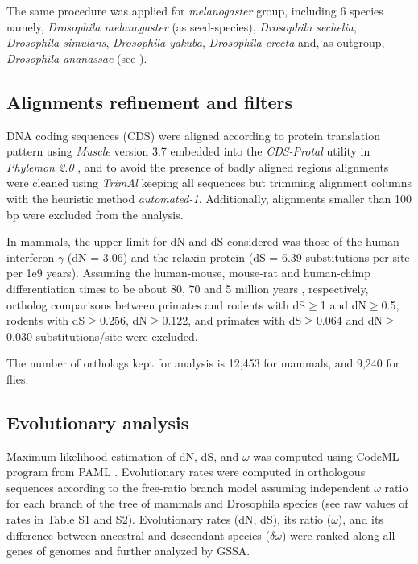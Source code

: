 The same procedure was applied for \textit{melanogaster} group, including 6 species namely, \textit{Drosophila melanogaster} (as \gls{seed}-species), \textit{Drosophila sechelia}, \textit{Drosophila simulans}, \textit{Drosophila yakuba}, \textit{Drosophila erecta} and, as outgroup, \textit{Drosophila ananassae} (see ).


\subsection{Alignments refinement and filters}
DNA coding sequences (CDS) were aligned according to protein translation pattern using \textit{Muscle} version 3.7 \cite{Edgar2004} embedded into the \textit{CDS-Protal} utility in \textit{Phylemon 2.0} \cite{Sanchez2011}, and to avoid the presence of badly aligned regions alignments were cleaned using \textit{TrimAl} \cite{Capella-Gutierrez2009} keeping all sequences but trimming alignment columns with the heuristic method \textit{automated-1}. Additionally, alignments smaller than 100 bp were excluded from the analysis. 

In mammals, the upper limit for dN and dS considered was those of the human interferon $\gamma$ (dN = 3.06) and the relaxin protein \cite{Graur2000} (dS = 6.39 substitutions per site per 1e9 years). Assuming the human-mouse, mouse-rat and human-chimp differentiation times to be about 80, 70 and 5 million years \cite{BlairHedges2003}, respectively, ortholog comparisons between primates and rodents with dS$\ge$1 and dN$\ge$0.5, rodents with dS$\ge$0.256, dN$\ge$0.122, and primates with dS$\ge$0.064 and dN$\ge$0.030 substitutions/site were excluded.

The number of orthologs kept for analysis is 12,453 for mammals, and 9,240 for flies.

\subsection{Evolutionary analysis}

Maximum likelihood estimation of dN, dS, and $\omega$ was computed using CodeML program from PAML \cite{Yang2007}. Evolutionary rates were computed in orthologous sequences according to the free-ratio branch model assuming independent $\omega$ ratio for each branch of the tree of mammals and Drosophila species (see raw values of rates in Table S1 and S2). Evolutionary rates (dN, dS), its ratio ($\omega$), and its difference between ancestral and descendant species ($\delta\omega$) were ranked along all genes of genomes and further analyzed by GSSA.

